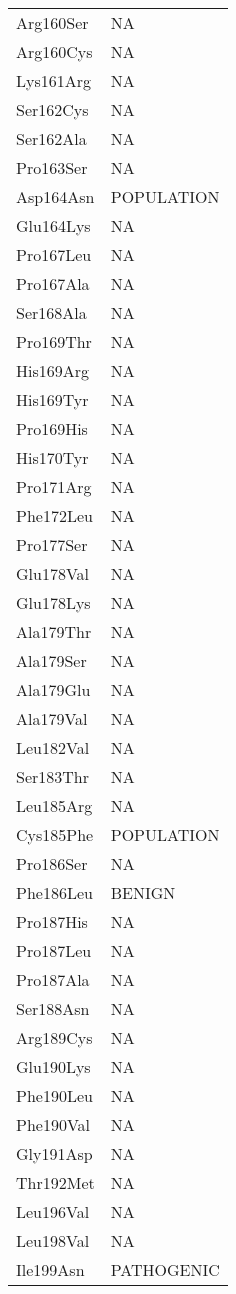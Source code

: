 \begin{longtable}[l]{l|l}
	Arg160Ser & NA \\
	Arg160Cys & NA \\
	Lys161Arg & NA \\
	Ser162Cys & NA \\
	Ser162Ala & NA \\
	Pro163Ser & NA \\
	Asp164Asn & POPULATION \\
	Glu164Lys & NA \\
	Pro167Leu & NA \\
	Pro167Ala & NA \\
	Ser168Ala & NA \\
	Pro169Thr & NA \\
	His169Arg & NA \\
	His169Tyr & NA \\
	Pro169His & NA \\
	His170Tyr & NA \\
	Pro171Arg & NA \\
	Phe172Leu & NA \\
	Pro177Ser & NA \\
	Glu178Val & NA \\
	Glu178Lys & NA \\
	Ala179Thr & NA \\
	Ala179Ser & NA \\
	Ala179Glu & NA \\
	Ala179Val & NA \\
	Leu182Val & NA \\
	Ser183Thr & NA \\
	Leu185Arg & NA \\
	Cys185Phe & POPULATION \\
	Pro186Ser & NA \\
	Phe186Leu & BENIGN \\
	Pro187His & NA \\
	Pro187Leu & NA \\
	Pro187Ala & NA \\
	Ser188Asn & NA \\
	Arg189Cys & NA \\
	Glu190Lys & NA \\
	Phe190Leu & NA \\
	Phe190Val & NA \\
	Gly191Asp & NA \\
	Thr192Met & NA \\
	Leu196Val & NA \\
	Leu198Val & NA \\
	Ile199Asn & PATHOGENIC \\

\end{longtable}
